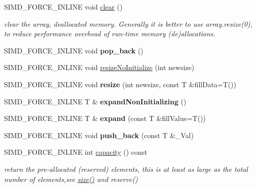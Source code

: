 \begin{DoxyCompactItemize}
S\+I\+M\+D\+\_\+\+F\+O\+R\+C\+E\+\_\+\+I\+N\+L\+I\+NE void \hyperlink{classbtAlignedObjectArray_a12123db01dda7758f0df5e3bba10cc0a}{clear} ()
\begin{DoxyCompactList}\small\item\em clear the array, deallocated memory. Generally it is better to use array.\+resize(0), to reduce performance overhead of run-\/time memory (de)allocations. \end{DoxyCompactList}\item 
\mbox{\label{classbtAlignedObjectArray_a6169be905e03b84ea3bc8d8f7c7fc39d}} 
S\+I\+M\+D\+\_\+\+F\+O\+R\+C\+E\+\_\+\+I\+N\+L\+I\+NE void {\bfseries pop\+\_\+back} ()
\item 
S\+I\+M\+D\+\_\+\+F\+O\+R\+C\+E\+\_\+\+I\+N\+L\+I\+NE void \hyperlink{classbtAlignedObjectArray_a2cc58c74534181a7a10e5c6ab8b21227}{resize\+No\+Initialize} (int newsize)
\item 
\mbox{\label{classbtAlignedObjectArray_a6a48cd9cb91d0cfa50ee1c70ef485190}} 
S\+I\+M\+D\+\_\+\+F\+O\+R\+C\+E\+\_\+\+I\+N\+L\+I\+NE void {\bfseries resize} (int newsize, const T \&fill\+Data=T())
\item 
\mbox{\label{classbtAlignedObjectArray_ad1f99f070780c42619386fd2a4336bec}} 
S\+I\+M\+D\+\_\+\+F\+O\+R\+C\+E\+\_\+\+I\+N\+L\+I\+NE T \& {\bfseries expand\+Non\+Initializing} ()
\item 
\mbox{\label{classbtAlignedObjectArray_ad64affb4ed3f9db81f832cbac6b62527}} 
S\+I\+M\+D\+\_\+\+F\+O\+R\+C\+E\+\_\+\+I\+N\+L\+I\+NE T \& {\bfseries expand} (const T \&fill\+Value=T())
\item 
\mbox{\label{classbtAlignedObjectArray_ad61e10166e2c00f487095d3482b9edd1}} 
S\+I\+M\+D\+\_\+\+F\+O\+R\+C\+E\+\_\+\+I\+N\+L\+I\+NE void {\bfseries push\+\_\+back} (const T \&\+\_\+\+Val)
\item 
\mbox{\label{classbtAlignedObjectArray_a1baf76f9f52df3c2d742194ba33e8788}} 
S\+I\+M\+D\+\_\+\+F\+O\+R\+C\+E\+\_\+\+I\+N\+L\+I\+NE int \hyperlink{classbtAlignedObjectArray_a1baf76f9f52df3c2d742194ba33e8788}{capacity} () const
\begin{DoxyCompactList}\small\item\em return the pre-\/allocated (reserved) elements, this is at least as large as the total number of elements,see \hyperlink{classbtAlignedObjectArray_a31de8d83d29c6edd1493fc583091194c}{size()} and reserve() \end{DoxyCompactList}\item 

\end{DoxyCompactItemize}

